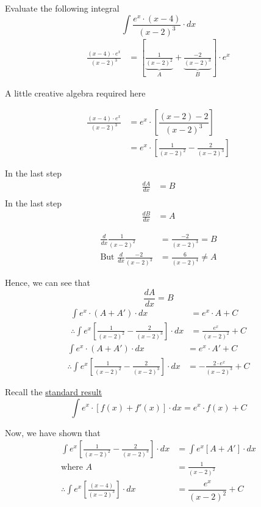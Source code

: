 \documentclass[12pt]{article}
\begin{document}
Evaluate the following integral 
\[ \int \dfrac{e^x\cdot (x-4)}{(x-2)^3}\cdot dx \]
\card 
\begin{align}
\frac{(x-4)\cdot e^x}{(x-2)^3} &= \left[\underbrace{\frac{1}{(x-2)^2}}_A+\underbrace{\frac{-2}{(x-2)^3}}_B\right]\cdot e^x 
\end{align}

\card 
A little creative algebra required here

\begin{align}
	\frac{(x-4)\cdot e^x}{(x-2)^3} &= e^x\cdot \left[ \dfrac{(x-2) - 2}{(x-2)^3}\right] \\
	&= e^x\cdot \left[ \frac{1}{(x-2)^2} - \frac{2}{(x-2)^3}\right]
\end{align}

\card 
In the last step
\begin{align}
	\frac{dA}{dx} &= B \\ 
\end{align}
\card 
In the last step 
\begin{align}
	\frac{dB}{dx} &= A 
\end{align}

\card 
\begin{align}
	\frac{d}{dx}\frac{1}{(x-2)^2} &= \frac{-2}{(x-2)^3} = B \\ 
	\text{But }\frac{d}{dx} \frac{-2}{(x-2)^3} &= \frac{6}{(x-2)^4} \neq A 
\end{align}

Hence, we can see that \[ \frac{dA}{dx} = B \]
\card 
\begin{align}
	\int e^x\cdot \left(A + A' \right)\cdot dx &= e^x\cdot A + C \\ 
	\therefore \int e^x \left[\frac{1}{(x-2)^2}-\frac{2}{(x-2)^3} \right]\cdot dx &= \frac{e^x}{(x-2)^2} + C 
\end{align}
\card 
\begin{align}
	\int e^x\cdot \left(A + A' \right)\cdot dx &= e^x\cdot A' + C \\ 
	\therefore \int e^x \left[\frac{1}{(x-2)^2}-\frac{2}{(x-2)^3} \right]\cdot dx &= -\frac{2\cdot e^x}{(x-2)^3} + C 
\end{align}

\card 
Recall the \underline{standard result}
\[ \int e^x\cdot \left[f(x) + f'(x) \right]\cdot dx = e^x\cdot f(x) + C\]

Now, we have shown that 
\begin{align}
	\int e^x \left[\frac{1}{(x-2)^2} - \frac{2}{(x-2)^3} \right]\cdot dx &= \int e^x \left[A + A' \right]\cdot dx \\
	\text{where } A &= \frac{1}{(x-2)^2} \\
	\therefore \int e^x \left[\frac{(x-4)}{(x-2)^3} \right]\cdot dx &= \dfrac{e^x}{(x-2)^2} + C 
\end{align}
\end{document}
